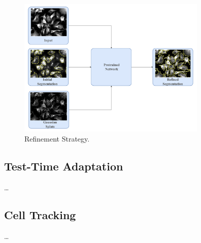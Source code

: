 \begin{figure}[t]
    \centering
    \includegraphics[width=9cm]{figs/refinement.pdf}
    \caption{Refinement Strategy.}
    \label{fig:refinement}
\end{figure}

\subsection{Test-Time Adaptation}
\dots
\subsection{Cell Tracking}
\dots